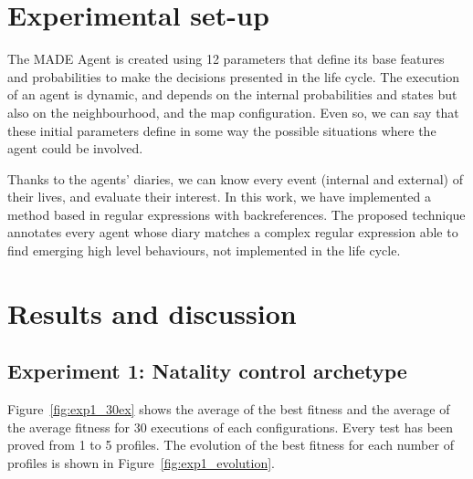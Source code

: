 \documentclass[runningheads]{llncs}
\begin{document}

\section{Experimental set-up}
\label{sec:experimentalsetup}

The MADE Agent is created using 12 parameters that define its base features and probabilities to make the decisions presented in the life cycle. The execution of an agent is dynamic, and depends on the internal probabilities and states but also on the neighbourhood, and the map configuration. Even so, we can say that these initial parameters define in some way the possible situations where the agent could be involved.

Thanks to the agents' diaries, we can know every event (internal and external) of their lives, and evaluate their interest. In this work, we have implemented a method based in regular expressions with backreferences. The proposed technique annotates every agent whose diary matches a complex regular expression able to find emerging high level behaviours, not implemented in the life cycle. 








\section{Results and discussion}
\label{sec:results}

\subsection{Experiment 1: Natality control archetype}


Figure~\ref{fig:exp1_30ex} shows the average of the best fitness and the average of the average fitness for 30 executions of each configurations. Every test has been proved from 1 to 5 profiles.
The evolution of the best fitness for each number of profiles is shown in Figure~\ref{fig:exp1_evolution}.
\end{document}
